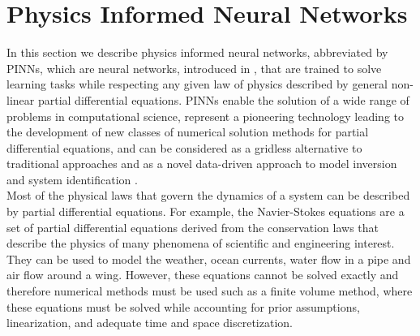\section{Physics Informed Neural Networks}
\label{ch1:sec4}

In this section we describe physics informed neural networks, abbreviated by PINNs, which are neural networks, introduced in \cite{RaissiPerdikarisKarniadakisPart1:2017}, that are trained to solve learning tasks while respecting any given law of physics described by general non-linear partial differential equations. PINNs enable the solution of a wide range of problems in computational science, represent a pioneering technology leading to the development of new classes of numerical solution methods for partial differential equations, and can be considered as a gridless alternative to traditional approaches and as a novel data-driven approach to model inversion and system identification \cite[p.~3]{RaissiPerdikarisKarniadakis:2019}. \\
Most of the physical laws that govern the dynamics of a system can be described by partial differential equations. For example, the Navier-Stokes equations are a set of partial differential equations derived from the conservation laws that describe the physics of many phenomena of scientific and engineering interest. They can be used to model the weather, ocean currents, water flow in a pipe and air flow around a wing. However, these equations cannot be solved exactly and therefore numerical methods must be used such as a finite volume method, where these equations must be solved while accounting for prior assumptions, linearization, and adequate time and space discretization. \\
